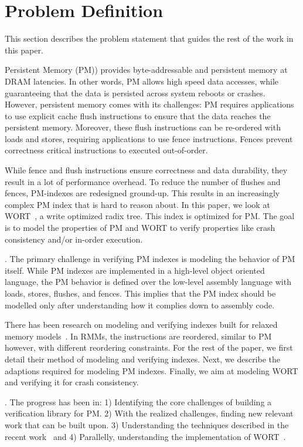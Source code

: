 \section{Problem Definition}

This section describes the problem statement that guides
the rest of the work in this paper.

 Persistent Memory (PM)) provides
byte-addressable and persistent memory at DRAM latencies.
In other words, PM allows high speed data accesses, while
guaranteeing that the data is persisted across system reboots
or crashes. However, persistent memory comes with its challenges:
PM requires applications to use explicit cache flush instructions
to ensure that the data reaches the persistent memory. Moreover,
these flush instructions can be re-ordered with loads and stores,
requiring applications to use fence instructions. Fences prevent
correctness critical instructions to executed out-of-order.

 While fence and flush instructions
ensure correctness and data durability, they result in a lot of
performance overhead. To reduce the number of flushes and fences,
PM-indexes are redesigned ground-up. This results in an increasingly
complex PM index that is hard to reason about. In this paper, we
look at WORT~\cite{201600}, a write
optimized radix tree. This index is optimized for PM. The goal is
to model the properties of PM and WORT to verify properties like
crash consistency and/or in-order execution.

. The primary challenge in
verifying PM indexes is modeling the behavior of PM itself. While
PM indexes are implemented in a high-level object oriented language,
the PM behavior is defined over the low-level assembly language with
loads, stores, flushes, and fences. This implies that the PM index
should be modelled only after understanding how it complies down to
assembly code.

 There has been research on modeling and
verifying indexes built for relaxed memory models~\cite{
    Lwn.net-Verify, Lwn.net-Spin, o2009model}.
In RMMs, the instructions are reordered, similar to PM however,
with different reordering constraints. For the rest of the paper,
we first detail their method of modeling and verifying indexes.
Next, we describe the adaptions required for modeling PM indexes.
Finally, we aim at modeling WORT and verifying it for
crash consistency.

. The progress has been in: 1) Identifying
the core challenges of building a verification library for PM.
2) With the realized challenges, finding new relevant work that can
be built upon. 3) Understanding the techniques described
in the recent work~\cite{o2009model} and 4) Parallelly, understanding the
implementation of WORT~\cite{201600}.